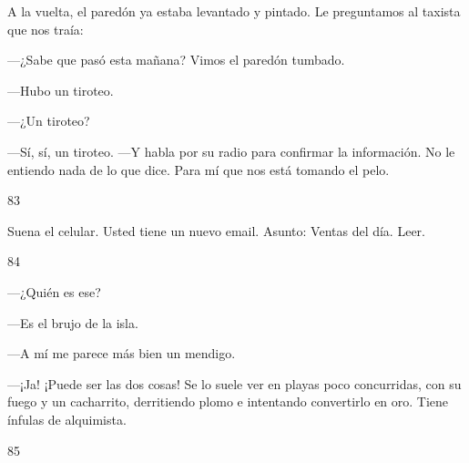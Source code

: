 \documentclass[12pt,twoside,openright,a5paper]{book}
\begin{document}
A la vuelta, el paredón ya estaba levantado y pintado. Le preguntamos
al taxista que nos traía:

---¿Sabe que pasó esta mañana? Vimos el paredón tumbado.

---Hubo un tiroteo.

---¿Un tiroteo?

---Sí, sí, un tiroteo. ---Y
habla por su radio para confirmar la información. No le entiendo nada de
lo que dice. Para mí que nos está tomando el pelo.

\vspace{0.5cm}

\hrulefill \hspace{0.1cm}\decofourleft\hspace{0.2cm} 83 \hspace{0.2cm}\decofourright \hspace{0.1cm}\hrulefill

\nopagebreak

\vspace{0.5cm}

\nopagebreak

Suena el celular. Usted tiene un nuevo email. Asunto: Ventas del día. Leer.

\vspace{0.5cm}

\hrulefill \hspace{0.1cm}\decofourleft\hspace{0.2cm} 84 \hspace{0.2cm}\decofourright \hspace{0.1cm}\hrulefill

\nopagebreak

\vspace{0.5cm}

\nopagebreak

---¿Quién es ese?

---Es el brujo de la isla.

---A mí me parece más bien un mendigo.

---¡Ja! ¡Puede ser las dos cosas! Se lo suele ver en playas poco concurridas,
con su fuego y un cacharrito, derritiendo plomo e intentando convertirlo
en oro.  Tiene ínfulas de alquimista.

\vspace{0.5cm}

\hrulefill \hspace{0.1cm}\decofourleft\hspace{0.2cm} 85 \hspace{0.2cm}\decofourright \hspace{0.1cm}\hrulefill
\end{document}
